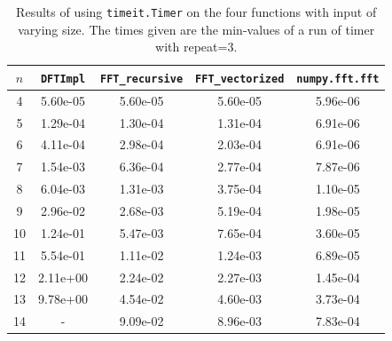 \documentclass[a4paper, 11pt, notitlepage, english]{article}
\begin{document}
\begin{table}
\centering
\begin{tabular}{c|c|c|c|c}
$n$ & \texttt{DFTImpl} & \texttt{FFT\_recursive} & \texttt{FFT\_vectorized} & \texttt{numpy.fft.fft} \\ \hline
4 & 5.60e-05 & 5.60e-05 & 5.60e-05 & 5.96e-06 \\ \hline
5 & 1.29e-04 & 1.30e-04 & 1.31e-04 & 6.91e-06 \\ \hline
6 & 4.11e-04 & 2.98e-04 & 2.03e-04 & 6.91e-06 \\ \hline
7 & 1.54e-03 & 6.36e-04 & 2.77e-04 & 7.87e-06 \\ \hline
8 & 6.04e-03 & 1.31e-03 & 3.75e-04 & 1.10e-05 \\ \hline
9 & 2.96e-02 & 2.68e-03 & 5.19e-04 & 1.98e-05 \\ \hline
10 & 1.24e-01 & 5.47e-03 & 7.65e-04 & 3.60e-05 \\ \hline
11 & 5.54e-01 & 1.11e-02 & 1.24e-03 & 6.89e-05 \\ \hline
12 & 2.11e+00 & 2.24e-02 & 2.27e-03 & 1.45e-04 \\ \hline
13 & 9.78e+00 & 4.54e-02 & 4.60e-03 & 3.73e-04 \\ \hline
14 & - & 9.09e-02 & 8.96e-03 & 7.83e-04 \\ \hline
\end{tabular}
\caption{Results of using \texttt{timeit.Timer} on the four functions with input of varying size. The times given are the min-values of a run of timer with repeat=3.}
\end{table}
\end{document}

